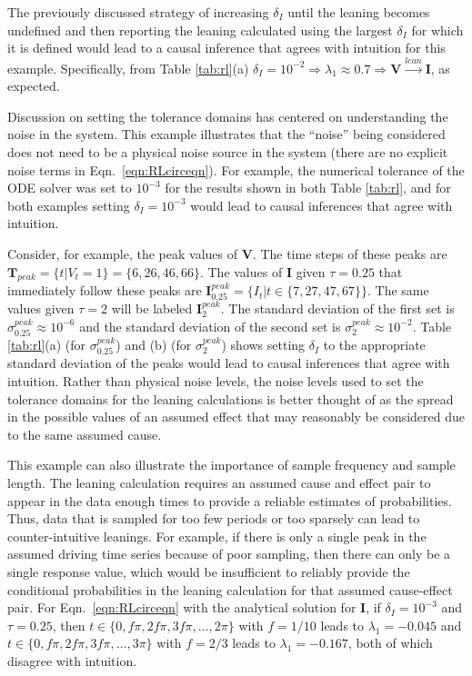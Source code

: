\documentclass[twocolumn,aps,pre,groupedaddress]{revtex4-1}
\begin{document}
The previously discussed strategy of increasing $\delta_I$ until the leaning becomes undefined and then reporting the leaning calculated using the largest $\delta_I$ for which it is defined would lead to a causal inference that agrees with intuition for this example.  Specifically, from Table \ref{tab:rl}(a) $\delta_I=10^{-2}\Rightarrow\lambda_1\approx 0.7\Rightarrow\mathbf{V}\xrightarrow{lean}\mathbf{I}$, as expected.  

Discussion on setting the tolerance domains has centered on understanding the noise in the system.  This example illustrates that the ``noise'' being considered does not need to be a physical noise source in the system (there are no explicit noise terms in Eqn.\ \ref{eqn:RLcirceqn}).  For example, the numerical tolerance of the ODE solver was set to $10^{-3}$ for the results shown in both Table \ref{tab:rl}, and for both examples setting $\delta_I=10^{-3}$ would lead to causal inferences that agree with intuition.  

Consider, for example, the peak values of $\mathbf{V}$.  The time steps of these peaks are $\mathbf{T}_{peak} = \{t|V_t =1\} = \{6,26,46,66\}$.  The values of $\mathbf{I}$ given $\tau = 0.25$ that immediately follow these peaks are $\mathbf{I}^{peak}_{0.25} = \{I_t|t\in\{7,27,47,67\}\}$.  The same values given $\tau=2$ will be labeled $\mathbf{I}^{peak}_2$.  The standard deviation of the first set is $\sigma_{0.25}^{peak} \approx 10^{-6}$ and the standard deviation of the second set is $\sigma_{2}^{peak} \approx 10^{-2}$.  Table \ref{tab:rl}(a) (for $\sigma_{0.25}^{peak}$) and (b) (for $\sigma_{2}^{peak}$) shows setting $\delta_I$ to the appropriate standard deviation of the peaks would lead to causal inferences that agree with intuition.  Rather than physical noise levels, the noise levels used to set the tolerance domains for the leaning calculations is better thought of as the spread in the possible values of an assumed effect that may reasonably be considered due to the same assumed cause.  
    
This example can also illustrate the importance of sample frequency and sample length.  The leaning calculation requires an assumed cause and effect pair to appear in the data enough times to provide a reliable estimates of probabilities.  Thus, data that is sampled for too few periods or too sparsely can lead to counter-intuitive leanings.  For example, if there is only a single peak in the assumed driving time series because of poor sampling, then there can only be a single response value, which would be insufficient to reliably provide the conditional probabilities in the leaning calculation for that assumed cause-effect pair.  For Eqn.\ \ref{eqn:RLcirceqn} with the analytical solution for $\mathbf{I}$, if $\delta_I=10^{-3}$ and $\tau = 0.25$, then $t\in\{0,f\pi,2f\pi,3f\pi,\ldots,2\pi\}$ with $f=1/10$ leads to $\lambda_1 = -0.045$ and $t\in\{0,f\pi,2f\pi,3f\pi,\ldots,3\pi\}$ with $f=2/3$ leads to $\lambda_1 = -0.167$, both of which disagree with intuition.
\end{document}
